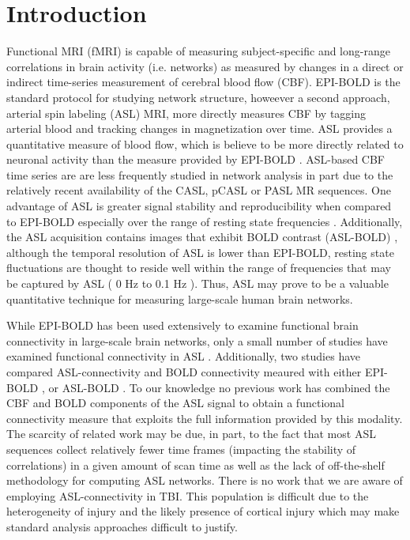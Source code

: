 \documentclass{llncs}
\begin{document}
\section{Introduction}
Functional MRI (fMRI) is capable of measuring subject-specific and long-range correlations in brain activity (i.e. networks) as measured by changes in a direct or indirect time-series measurement of cerebral blood flow (CBF).  EPI-BOLD is the standard protocol for studying network structure, howeever a second approach, arterial spin labeling (ASL) MRI, more directly measures CBF by tagging arterial blood and tracking changes in magnetization over time. ASL provides a quantitative measure of blood flow, which is believe to be more directly related to neuronal activity than the measure provided by EPI-BOLD \cite{Wong1997}.  ASL-based CBF time series are are less frequently studied in network analysis in part due to the relatively recent availability of the CASL, pCASL or PASL MR sequences.  One advantage of ASL is greater signal stability and reproducibility when compared to EPI-BOLD especially over the range of resting state frequencies \cite{Aguirre2002}.  Additionally, the ASL acquisition contains images that exhibit BOLD contrast (ASL-BOLD) \cite{Wong1997}, although the temporal resolution of ASL is lower than EPI-BOLD, resting state fluctuations are thought to reside well within the range of frequencies that may be captured by ASL ( 0 Hz to 0.1 Hz ).  Thus, ASL may prove to be a valuable quantitative technique for measuring large-scale human brain networks.


While EPI-BOLD has been used extensively to examine functional brain connectivity in large-scale brain networks, only a small number of studies have examined functional connectivity in ASL \cite{Chuang2008,Zou2009}. Additionally, two studies have compared ASL-connectivity and BOLD connectivity meaured with either EPI-BOLD \cite{Li2012}, or ASL-BOLD \cite{Viviani2011}.  To our knowledge no previous work has combined the CBF and BOLD components of the ASL signal to obtain a functional connectivity measure that exploits the full information provided by this modality. The scarcity of related work may be due, in part, to the fact that most ASL sequences collect relatively fewer time frames (impacting the stability of correlations) in a given amount of scan time as well as the lack of off-the-shelf methodology for computing ASL networks.  There is no work that we are aware of employing ASL-connectivity in TBI.   This population is difficult due to the heterogeneity of injury and the likely presence of cortical injury which may make standard analysis approaches difficult to justify. 
\end{document}
